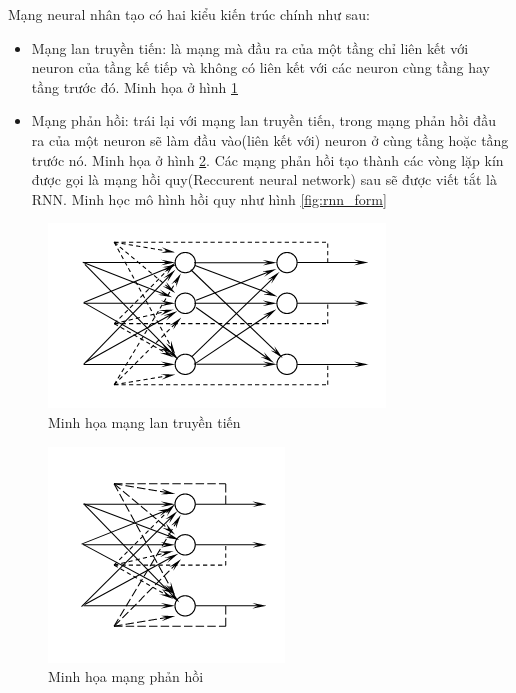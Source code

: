 \documentclass[fontsize=12pt]{scrartcl}
\begin{document}
Mạng neural nhân tạo có hai kiểu kiến trúc chính như sau:
\begin{itemize}
\item Mạng lan truyền tiến: là mạng mà đầu ra của một tầng chỉ liên kết với neuron của tầng kế tiếp và không có liên kết với các neuron cùng tầng hay tầng trước đó. Minh họa ở hình \ref{fig:feedforward_nn}
\item Mạng phản hồi: trái lại với mạng lan truyền tiến, trong mạng phản hồi đầu ra của một neuron sẽ làm đầu vào(liên kết với) neuron ở cùng tầng hoặc tầng trước nó. Minh họa ở hình \ref{fig:phan_hoi}. Các mạng phản hồi tạo thành các vòng lặp kín được gọi là mạng hồi quy(Reccurent neural network) sau sẽ được viết tắt là RNN. Minh học mô hình hồi quy như hình \ref{fig:rnn_form}
\end{itemize}
\begin{figure}
     \includegraphics[width=\textwidth]{img/feedforward_nn.png}
      \caption{Minh họa mạng lan truyền tiến}
       \label{fig:feedforward_nn}
\end{figure}
\begin{figure}
     \includegraphics[width=\textwidth]{img/hoi_quy}
      \caption{Minh họa mạng phản hồi}
       \label{fig:phan_hoi}
\end{figure}
\end{document}

